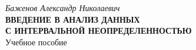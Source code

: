\documentclass[a5paper,openany]{book}
\newcounter{Examp}
\begin{document}
\newpage

\makeatletter
\renewcommand\@biblabel[1]{#1.}
\makeatother
{}
	



\raggedright\small\printindex   


\newpage
\begin{center}
	\hfill \break
	
	\Large{\it Баженов Александр Николаевич\\
		\hfill \break		\hfill \break		}
	{\Large	\bf{ВВЕДЕНИЕ В АНАЛИЗ ДАННЫХ\\
			С ИНТЕРВАЛЬНОЙ НЕОПРЕДЕЛЕННОСТЬЮ}}\\
	\hfill \break 	\hfill \break	
	\Large{	Учебное пособие	
	}\\
\end{center}

\hfill \break	
\end{document}
